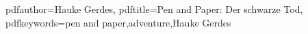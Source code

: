 
\newcommand{\adventurename}{Der schwarze Tod}
\newcommand{\mainauthor}{Hauke Gerdes}
\newcommand{\coauthor}{Paul Filip}

\newcommand{\ruleset}{How to be a hero}
\newcommand{\ruleseturl}{www.howtobeahero.de}

\newcommand{\place}{Hamburg}
\newcommand{\storytime}{1350 n. Chr.}
\newcommand{\playercount}{3 - 5}
\newcommand{\difficulty}{einfach}
\newcommand{\duration}{3-4 Stunden}

\hypersetup
{
	pdfauthor={\mainauthor},
	pdftitle={Pen and Paper: \adventurename},
	pdfkeywords={pen and paper,adventure,\mainauthor}
}
